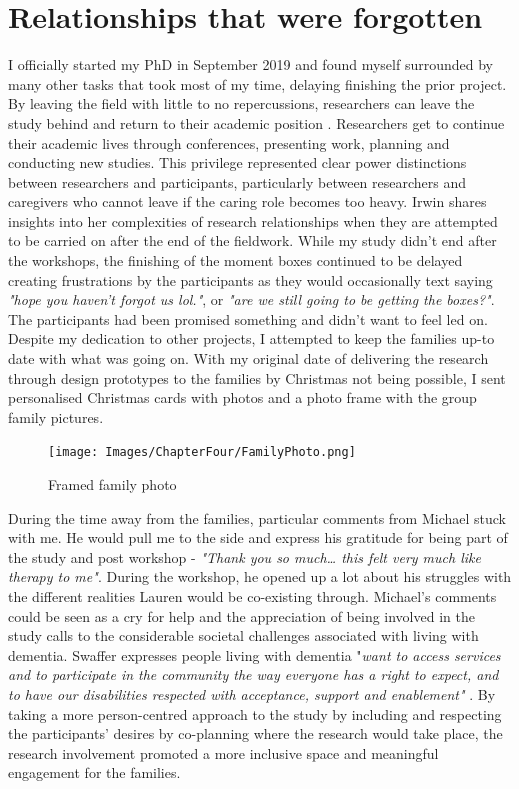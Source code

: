 \section{Relationships that were forgotten}
\label{Relationships:forgotten}
I officially started my PhD in September 2019 and found myself surrounded by many other tasks that took most of my time, delaying finishing the prior project. By leaving the field with little to no repercussions, researchers can leave the study behind and return to their academic position \citep{abulughod_can_1990, gottfried_beyond_2016, irwin_into_2006}. Researchers get to continue their academic lives through conferences, presenting work, planning and conducting new studies. This privilege represented clear power distinctions between researchers and participants, particularly between researchers and caregivers who cannot leave if the caring role becomes too heavy. Irwin shares insights into her complexities of research relationships when they are attempted to be carried on after the end of the fieldwork. While my study didn't end after the workshops, the finishing of the moment boxes continued to be delayed creating frustrations by the participants as they would occasionally text saying \textit{"hope you haven't forgot us lol."}, or \textit{"are we still going to be getting the boxes?"}. The participants had been promised something and didn't want to feel led on. Despite my dedication to other projects, I attempted to keep the families up-to date with what was going on. With my original date of delivering the research through design prototypes to the families by Christmas not being possible, I sent personalised Christmas cards with photos and a photo frame with the group family pictures. 
 

\begin{figure}
\centering
\texttt{[image: Images/ChapterFour/FamilyPhoto.png]}
\caption{Framed family photo}
\label{fig:familyPhoto}
\end{figure}

During the time away from the families, particular comments from Michael stuck with me. He would pull me to the side and express his gratitude for being part of the study and post workshop - \textit{"Thank you so much… this felt very much like therapy to me"}. During the workshop, he opened up a lot about his struggles with the different realities Lauren would be co-existing through. Michael's comments could be seen as a cry for help and the appreciation of being involved in the study calls to the considerable societal challenges associated with living with dementia. Swaffer expresses people living with dementia "\textit{want to access services and to participate in the community the way everyone has a right to expect, and to have our disabilities respected with acceptance, support and enablement"} \citep{swaffer_dementia_2014}. By taking a more person-centred approach to the study by including and respecting the participants' desires by co-planning where the research would take place, the research involvement promoted a more inclusive space and meaningful engagement for the families. 
 
